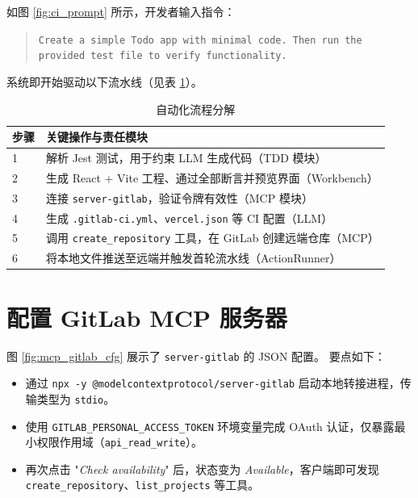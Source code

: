 如图 \ref{fig:ci_prompt} 所示，开发者输入指令：

\begin{quote}\small
\texttt{Create a simple Todo app with minimal code. Then run the provided test file to verify functionality.}
\end{quote}

系统即开始驱动以下流水线（见表 \ref{tab:cicd-steps}）。

\begin{table}[htbp]
  \centering
  \caption{自动化流程分解}
  \label{tab:cicd-steps}
  \begin{tabular}{@{}lp{9.2cm}@{}}
    \toprule
    步骤 & 关键操作与责任模块 \\
    \midrule
    1 & 解析 Jest 测试，用于约束 LLM 生成代码（TDD 模块） \\
    2 & 生成 React + Vite 工程、通过全部断言并预览界面（Workbench） \\
    3 & 连接 \texttt{server-gitlab}，验证令牌有效性（MCP 模块） \\
    4 & 生成 \texttt{.gitlab-ci.yml}、\texttt{vercel.json} 等 CI 配置（LLM） \\
    5 & 调用 \texttt{create\_repository} 工具，在 GitLab 创建远端仓库（MCP） \\
    6 & 将本地文件推送至远端并触发首轮流水线（ActionRunner） \\
    \bottomrule
  \end{tabular}
\end{table}

\section{配置 GitLab MCP 服务器}
\label{sec:cicd-mcp-config}

图 \ref{fig:mcp_gitlab_cfg} 展示了 \texttt{server-gitlab} 的 JSON 配置。  
要点如下：

\begin{itemize}
  \item 通过 \texttt{npx -y @modelcontextprotocol/server-gitlab} 启动本地转接进程，传输类型为 \texttt{stdio}。  
  \item 使用 \texttt{GITLAB\_PERSONAL\_ACCESS\_TOKEN} 环境变量完成 OAuth 认证，仅暴露最小权限作用域（\texttt{api\_read\_write}）。  
  \item 再次点击 "\emph{Check availability}" 后，状态变为 \emph{Available}，客户端即可发现 \texttt{create\_repository}、\texttt{list\_projects} 等工具。  
\end{itemize}

